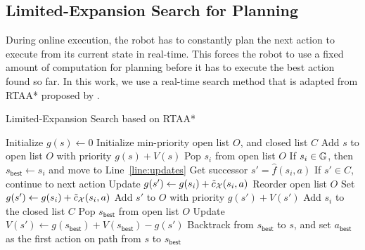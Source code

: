 \subsection{Limited-Expansion Search for Planning}
\label{sec:limit-expans-search}

During online execution, the robot has to constantly plan the next
action to execute from its current state in real-time. This forces the
robot to use a fixed amount of computation for planning before it has
to execute the best action found so far. In this work, we use
a real-time search method that is adapted from RTAA*
proposed by \cite{DBLP:conf/atal/KoenigL06}.

\begin{algorithm}[t]
  \caption{Limited-Expansion Search based on
    RTAA*\cite{DBLP:conf/atal/KoenigL06}}
  {\normalsize
  \begin{algorithmic}[1]
    \State Initialize $g(s) \leftarrow 0$
    \State Initialize min-priority open list $O$, and closed list $C$
    \State Add $s$ to open list $O$ with priority $g(s) + V(s)$
    \State Pop $s_i$ from open list $O$
    \State If $s_i \in \mathbb{G}$, then $s_{\mathsf{best}} \leftarrow
    s_i$ and move to Line~\ref{line:updates}
     
    \State Get successor $s' = \hat{f}(s_i, a)$
    \State If $s' \in C$, continue to next action
    \State Update $g(s') \leftarrow g(s_i) + \tilde{c}_{\mathcal{X}}(s_i,
    a)$
    \State Reorder open list $O$
    \State Set $g(s') \leftarrow g(s_i) + \tilde{c}_{\mathcal{X}}(s_i, a)$
    \State Add $s'$ to $O$ with priority $g(s') + V(s')$
    \EndIf
    \EndFor
    \State Add $s_i$ to the closed list $C$
    \EndFor
    \State Pop $s_{\mathsf{best}}$ from open list
    $O$\label{line:pop-best-node}
    \label{line:updates}
    \State Update $V(s') \leftarrow
    g(s_{\mathsf{best}}) + V(s_{\mathsf{best}}) - g(s')$\label{line:cost-to-go-update}
    \EndFor
    \State Backtrack from $s_{\mathsf{best}}$ to $s$, and set
    $a_{\mathsf{best}}$ as the first action on path from $s$ to
    $s_{\mathsf{best}}$
    
    \EndFunction
  \end{algorithmic}}
  \label{alg:limited-expansion-search}
\end{algorithm}

